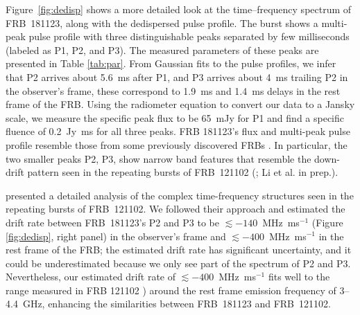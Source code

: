 
Figure~\ref{fig:dedisp} shows a more detailed look at the time--frequency spectrum of FRB~181123, along with the dedispersed pulse profile. The burst shows a multi-peak pulse profile with three distinguishable peaks separated by few milliseconds (labeled as P1, P2, and P3). The measured parameters of these peaks are presented in Table \ref{tab:par}. 
From Gaussian fits to the pulse profiles, we infer that P2 arrives about 5.6~ms after P1, and P3 arrives about 4~ms trailing P2 in the observer's frame, these correspond to 1.9~ms and 1.4~ms delays in the rest frame of the FRB.
Using the radiometer equation to convert our data to a Jansky scale, we measure the specific peak flux to be 65~mJy for P1 and find a specific fluence of 0.2~Jy~ms for all three peaks.
FRB 181123's flux and multi-peak pulse profile resemble those from some previously discovered FRBs \citep{cpk+16}.
In particular, the two smaller peaks P2, P3, show narrow band features that resemble the down-drift pattern seen in the repeating bursts of FRB~121102 (\citealt{gsp+18, hessels19}; Li et al. in prep.). 

 \citet{hessels19} presented a detailed analysis of the complex time-frequency structures seen in the repeating bursts of FRB~121102. We followed their approach and estimated the drift rate between FRB~181123's P2 and P3 to be $\lesssim-140$~MHz~ms$^{-1}$ (Figure \ref{fig:dedisp}, right panel) in the observer's frame and $\lesssim-400$~MHz~ms$^{-1}$ in the rest frame of the FRB; the estimated drift rate has significant uncertainty, and it could be underestimated because we only see part of the spectrum of P2 and P3. 
Nevertheless, our estimated drift rate of $\lesssim-400$~MHz~ms$^{-1}$ fits well to the range measured in FRB 121102 \citet{hessels19}) around the rest frame emission frequency of 3--4.4~GHz, enhancing the similarities between FRB~181123 and FRB~121102.

